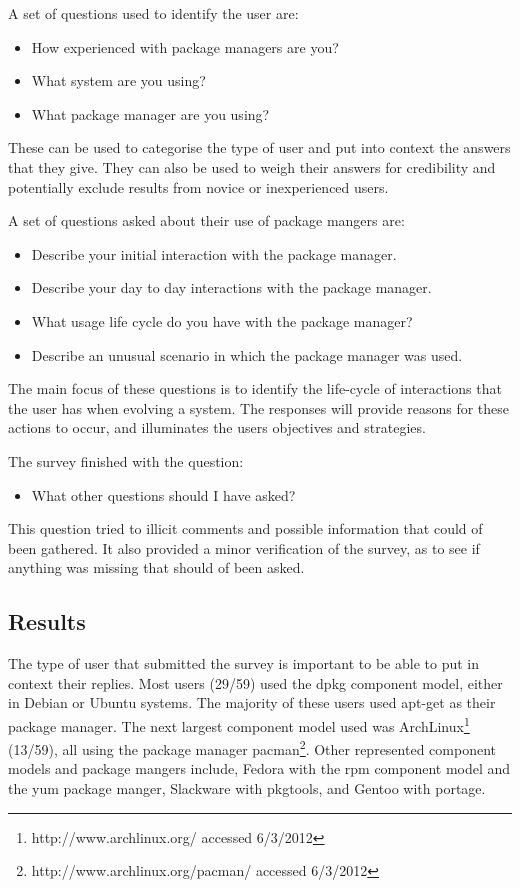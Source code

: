 A set of questions used to identify the user are:
\begin{itemize}
  \item How experienced with package managers are you? 
  \item What system are you using?
  \item What package manager are you using?
\end{itemize}
These can be used to categorise the type of user and put into context the answers that they give.
They can also be used to weigh their answers for credibility and potentially exclude results from novice or inexperienced users. 

A set of questions asked about their use of package mangers are:
\begin{itemize}
  \item Describe your initial interaction with the package manager.
  \item Describe your day to day interactions with the package manager.
  \item What usage life cycle do you have with the package manager?
  \item Describe an unusual scenario in which the package manager was used.
\end{itemize}
The main focus of these questions is to identify the life-cycle of interactions that the user has when evolving a system.
The responses will provide reasons for these actions to occur, and illuminates the users objectives and strategies.

The survey finished with the question:
\begin{itemize}
  \item What other questions should I have asked?
\end{itemize}
This question tried to illicit comments and possible information that could of been gathered.
It also provided a minor verification of the survey, as to see if anything was missing that should of been asked.

\subsection{Results}
The type of user that submitted the survey is important to be able to put in context their replies.
Most users (29/59) used the dpkg component model, either in Debian or Ubuntu systems.
The majority of these users used apt-get as their package manager.
The next largest component model used was ArchLinux\footnote{http://www.archlinux.org/ accessed 6/3/2012} (13/59),
all using the package manager pacman\footnote{http://www.archlinux.org/pacman/ accessed 6/3/2012}.
Other represented component models and package mangers include, Fedora with the rpm component model and the yum package manger,
Slackware with pkgtools, and Gentoo with portage.

